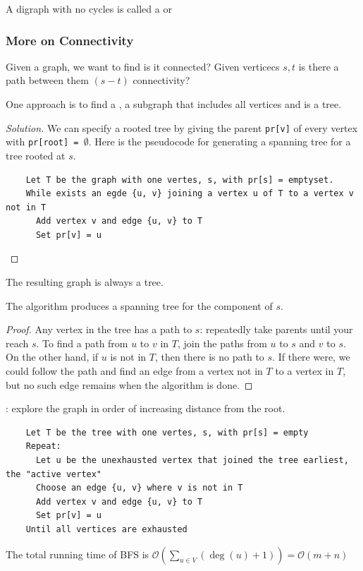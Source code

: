 \documentclass[12pt]{scrartcl}
\begin{document}
\begin{definition}
  A digraph with no cycles is called a  or 
\end{definition}

\subsubsection{More on Connectivity}

Given a graph, we want to find is it connected? Given verticecs $s, t$ is there a path 
between them $(s-t)$ connectivity?

One approach is to find a , a subgraph that includes all vertices 
and is a tree. 

\begin{proof}[Solution]
  We can specify a rooted tree by giving the parent \verb|pr[v]| of every vertex with 
  \verb|pr[root] = |$\emptyset$. Here is the pseudocode for generating a spanning tree for a tree rooted at $s$. 
  \begin{lstlisting}
    Let T be the graph with one vertes, s, with pr[s] = emptyset. 
    While exists an egde {u, v} joining a vertex u of T to a vertex v not in T
      Add vertex v and edge {u, v} to T
      Set pr[v] = u
  \end{lstlisting}
\end{proof}

The resulting graph is always a tree. 

\begin{lemma}
   The algorithm produces a spanning tree for the component of $s$. 

   \begin{proof}
    Any vertex in the tree has a path to $s$: repeatedly take parents until your reach $s$. 
    To find a path from $u$ to $v$ in $T$, join the paths from $u$ to $s$ and $v$ to $s$. 
    On the other hand, if $u$ is not in $T$, then there is no path to $s$. If there were, we could 
    follow the path and find an edge from a vertex not in $T$ to a vertex in $T$, but no such 
    edge remains when the algorithm is done. 
   \end{proof}
\end{lemma}

\begin{definition}
  : explore the graph in order of increasing distance from the root.
  \begin{lstlisting}
    Let T be the tree with one vertes, s, with pr[s] = empty
    Repeat:
      Let u be the unexhausted vertex that joined the tree earliest, the "active vertex"
      Choose an edge {u, v} where v is not in T
      Add vertex v and edge {u, v} to T
      Set pr[v] = u
    Until all vertices are exhausted
  \end{lstlisting}
  The total running time of BFS is $\mathcal{O}(\sum_{u \in V} (\deg(u) + 1)) = \mathcal{O}(m + n)$
\end{definition}
\end{document}
